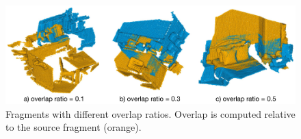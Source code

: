 \begin{figure}[t]
    \centering
    \includegraphics[width=\columnwidth]{figures/images/overlap_samples.pdf}
    \caption{Fragments with different overlap ratios. Overlap is computed relative to the source fragment (orange).}
    \label{fig:demo_overlap}
    
\end{figure}